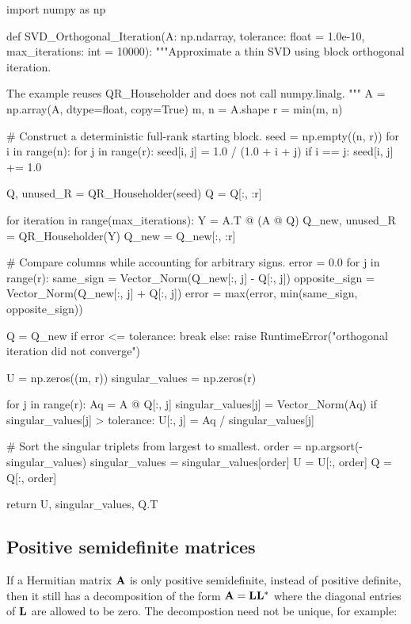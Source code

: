 \begin{python}
import numpy as np


def SVD_Orthogonal_Iteration(A: np.ndarray,
                             tolerance: float = 1.0e-10,
                             max_iterations: int = 10000):
    """Approximate a thin SVD using block orthogonal iteration.

    The example reuses QR_Householder and does not call numpy.linalg.
    """
    A = np.array(A, dtype=float, copy=True)
    m, n = A.shape
    r = min(m, n)

    # Construct a deterministic full-rank starting block.
    seed = np.empty((n, r))
    for i in range(n):
        for j in range(r):
            seed[i, j] = 1.0 / (1.0 + i + j)
            if i == j:
                seed[i, j] += 1.0

    Q, unused_R = QR_Householder(seed)
    Q = Q[:, :r]

    for iteration in range(max_iterations):
        Y = A.T @ (A @ Q)
        Q_new, unused_R = QR_Householder(Y)
        Q_new = Q_new[:, :r]

        # Compare columns while accounting for arbitrary signs.
        error = 0.0
        for j in range(r):
            same_sign = Vector_Norm(Q_new[:, j] - Q[:, j])
            opposite_sign = Vector_Norm(Q_new[:, j] + Q[:, j])
            error = max(error, min(same_sign, opposite_sign))

        Q = Q_new
        if error <= tolerance:
            break
    else:
        raise RuntimeError("orthogonal iteration did not converge")

    U = np.zeros((m, r))
    singular_values = np.zeros(r)

    for j in range(r):
        Aq = A @ Q[:, j]
        singular_values[j] = Vector_Norm(Aq)
        if singular_values[j] > tolerance:
            U[:, j] = Aq / singular_values[j]

    # Sort the singular triplets from largest to smallest.
    order = np.argsort(-singular_values)
    singular_values = singular_values[order]
    U = U[:, order]
    Q = Q[:, order]

    return U, singular_values, Q.T
\end{python}


\subsection{Positive semidefinite matrices}

If a Hermitian matrix $ \mathbf{A} $ is only positive semidefinite, instead of positive
definite, then it still has a decomposition of the form $ \mathbf{A} = \mathbf{L} \mathbf{L}^* $
where the diagonal entries of $ \mathbf{L} $ are allowed to be zero. The decompostion
need not be unique, for example:

